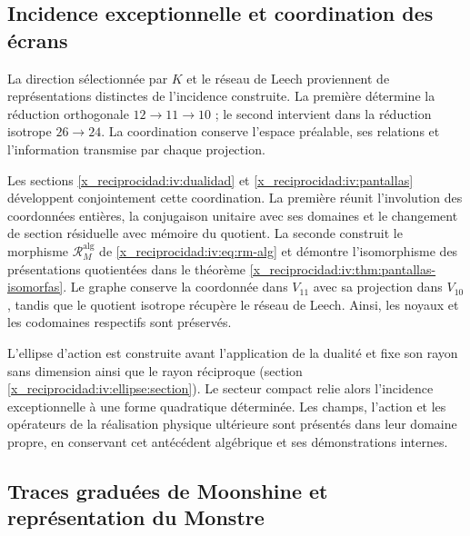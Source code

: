 


\subsection{Incidence exceptionnelle et coordination des écrans}
\label{x_reciprocidad:exc:pantallas-dualidad}

La direction sélectionnée par \(K\) et le réseau de Leech proviennent
de représentations distinctes de l’incidence construite. La première
détermine la réduction orthogonale \(12\to11\to10\) ; le second
intervient dans la réduction isotrope \(26\to24\). La coordination
conserve l’espace préalable, ses relations et l’information transmise
par chaque projection.

Les sections \ref{x_reciprocidad:iv:dualidad} et \ref{x_reciprocidad:iv:pantallas} développent
conjointement cette coordination. La première réunit l’involution des
coordonnées entières, la conjugaison unitaire avec ses domaines et le
changement de section résiduelle avec mémoire du quotient. La seconde
construit le morphisme \(\mathcal R_M^{\mathrm{alg}}\) de
\eqref{x_reciprocidad:iv:eq:rm-alg} et démontre l’isomorphisme des présentations
quotientées dans le théorème \ref{x_reciprocidad:iv:thm:pantallas-isomorfas}.
Le graphe conserve la coordonnée dans \(V_{11}\) avec sa projection
dans \(V_{10}\), tandis que le quotient isotrope récupère le réseau
de Leech. Ainsi, les noyaux et les codomaines respectifs sont préservés.

L’ellipse d’action est construite avant l’application de la dualité et fixe
son rayon sans dimension ainsi que le rayon réciproque
(section \ref{x_reciprocidad:iv:ellipse:section}). Le secteur compact relie alors
l’incidence exceptionnelle à une forme quadratique déterminée. Les
champs, l’action et les opérateurs de la réalisation physique ultérieure
sont présentés dans leur domaine propre, en conservant cet antécédent
algébrique et ses démonstrations internes.



\subsection{Traces graduées de Moonshine et représentation du Monstre}
\label{x_reciprocidad:exc:alcance}

